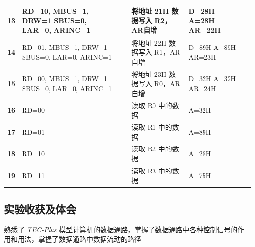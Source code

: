 \begin{table}[htbp]
{\begin{tabular}{|c|>{\centering\arraybackslash}p{4cm}|c|>{\centering\arraybackslash}p{6cm}|>{\centering\arraybackslash}p{3cm}|c|}
            \textbf{13} & RD=10, MBUS=1, DRW=1 SBUS=0, LAR=0, ARINC=1 & & 将地址 21H 数据写入 R2，AR自增 & D=28H A=28H AR=22H & \\ \hline
            \textbf{14} & RD=01, MBUS=1, DRW=1 SBUS=0, LAR=0, ARINC=1 & & 将地址 22H 数据写入 R1，AR自增 & D=89H A=89H AR=23H & \\ \hline
            \textbf{15} & RD=00, MBUS=1, DRW=1 SBUS=0, LAR=0, ARINC=1 & & 将地址 23H 数据写入 R0，AR自增 & D=32H A=32H AR=24H & \\ \hline
            \textbf{16} & RD=00 & & 读取 R0 中的数据 & A=32H & \\ \hline
            \textbf{17} & RD=01 & & 读取 R1 中的数据 & A=89H & \\ \hline
            \textbf{18} & RD=10 & & 读取 R2 中的数据 & A=28H & \\ \hline
            \textbf{19} & RD=11 & & 读取 R3 中的数据 & A=75H & \\ \hline
        \end{tabular}
        } 
    \end{table}

    \subsection{实验收获及体会}
        \par 熟悉了 \textit{TEC-Plus} 模型计算机的数据通路，掌握了数据通路中各种控制信号的作用和用法，掌握了数据通路中数据流动的路径

    